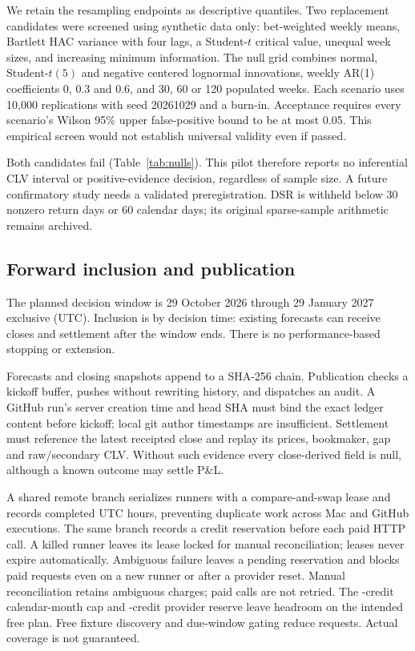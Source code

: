 \documentclass[11pt]{article}
\begin{document}
We retain the resampling endpoints as descriptive quantiles. Two replacement candidates
were screened using synthetic data only: bet-weighted weekly means, Bartlett HAC variance
with four lags, a Student-$t$ critical value, unequal week sizes, and increasing minimum
information. The null grid combines normal, Student-$t(5)$ and negative centered lognormal
innovations, weekly AR(1) coefficients 0, 0.3 and 0.6, and 30, 60 or 120 populated weeks.
Each scenario uses 10,000 replications with seed 20261029 and a burn-in. Acceptance requires
every scenario's Wilson 95\% upper false-positive bound to be at most 0.05. This empirical
screen would not establish universal validity even if passed.

Both candidates fail (Table~\ref{tab:nulls}). This pilot therefore reports no inferential
CLV interval or positive-evidence decision, regardless of sample size. A future confirmatory
study needs a validated preregistration. DSR is withheld below 30 nonzero return days or
60 calendar days; its original sparse-sample arithmetic remains archived.

\subsection{Forward inclusion and publication}
The planned decision window is 29 October 2026 through 29 January 2027 exclusive (UTC).
Inclusion is by decision time: existing forecasts can receive closes and settlement after
the window ends. There is no performance-based stopping or extension.

Forecasts and closing snapshots append to a SHA-256 chain. Publication checks a kickoff
buffer, pushes without rewriting history, and dispatches an audit. A GitHub run's server
creation time and head SHA must bind the exact ledger content before kickoff; local git
author timestamps are insufficient. Settlement must reference the latest receipted close
and replay its prices, bookmaker, gap and raw/secondary CLV. Without such evidence every
close-derived field is null, although a known outcome may settle P\&L.

A shared remote branch serializes runners with a compare-and-swap lease and records
completed UTC hours, preventing duplicate work across Mac and GitHub executions. The same
branch records a credit reservation before each paid HTTP call. A killed runner leaves its
lease locked for manual reconciliation; leases never expire automatically. Ambiguous failure leaves a pending reservation and blocks paid requests even
on a new runner or after a provider reset. Manual reconciliation retains ambiguous charges;
paid calls are not retried. The \creditCap{}-credit calendar-month cap and
\creditReserve{}-credit provider reserve leave headroom on the intended free plan. Free
fixture discovery and due-window gating reduce requests. Actual coverage is not guaranteed.
\end{document}
